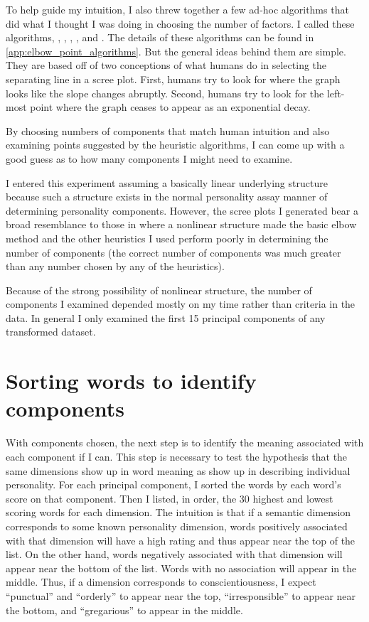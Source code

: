 To help guide my intuition, I also threw together a few ad-hoc algorithms that 
did what I thought I was doing in choosing the number of factors. I called 
these algorithms, , , 
, , and 
. The details of these algorithms can 
be found in \ref{app:elbow_point_algorithms}. But the general ideas behind them 
are simple. They are based off of two conceptions of what humans do in selecting 
the separating line in a scree plot. First, humans try to look for where the 
graph looks like the slope changes abruptly. Second, humans try to look for the 
left-most point where the graph ceases to appear as an exponential decay.

By choosing numbers of components that match human intuition and also
examining points suggested by the heuristic algorithms, I can come up
with a good guess as to how many components I might need to examine.

I entered this experiment assuming a basically linear underlying structure 
because such a structure exists in the normal personality assay manner of 
determining personality components. However, the scree plots I generated bear a 
broad resemblance to those in \citep{Moyer2014} where a nonlinear structure made 
the basic elbow method and the other heuristics I used perform poorly in 
determining the number of components (the correct number of components was much 
greater than any number chosen by any of the heuristics).

Because of the strong possibility of nonlinear structure, the number
of components I examined depended mostly on my time rather than
criteria in the data. In general I only examined the first 15
principal components of any transformed dataset.

\section{Sorting words to identify components}

With components chosen, the next step is to identify the meaning associated with 
each component if I can. This step is necessary to test the hypothesis that the 
same dimensions show up in word meaning as show up in describing individual 
personality. For each principal component, I sorted the words by each word's 
score on that component. Then I listed, in order, the 30 highest and lowest 
scoring words for each dimension. The intuition is that if a semantic dimension 
corresponds to some known personality dimension, words positively associated 
with that dimension will have a high rating and thus appear near the top of the 
list. On the other hand, words negatively associated with that dimension will 
appear near the bottom of the list. Words with no association will appear in the 
middle. Thus, if a dimension corresponds to conscientiousness, I expect 
``punctual'' and ``orderly'' to appear near the top, ``irresponsible'' to appear 
near the bottom, and ``gregarious'' to appear in the middle.

